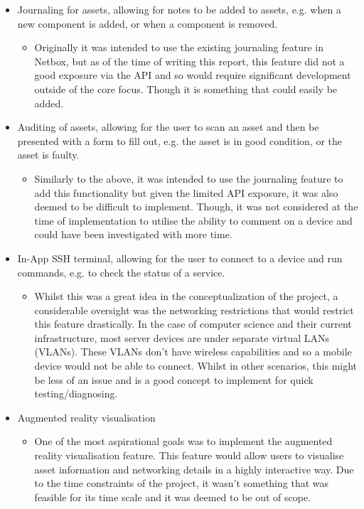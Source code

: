 \documentclass [11pt,a4paper]{article}
\begin{document}
\begin{itemize}[noitemsep,topsep=0pt]
\item Journaling for assets, allowing for notes to be added to assets, e.g. when a new component is added, or when a component is removed.
\begin{itemize}
    \item Originally it was intended to use the existing journaling feature in Netbox, but as of the time of writing this report, this feature did not a good exposure via the API and so would require significant development outside of the core focus. Though it is something that could easily be added.
\end{itemize} 

\item Auditing of assets, allowing for the user to scan an asset and then be presented with a form to fill out, e.g. the asset is in good condition, or the asset is faulty. 
\begin{itemize}
    \item Similarly to the above, it was intended to use the journaling feature to add this functionality but given the limited API exposure, it was also deemed to be difficult to implement. Though, it was not considered at the time of implementation to utilise the ability to comment on a device and could have been investigated with more time. 
\end{itemize} 

\item In-App SSH terminal, allowing for the user to connect to a device and run commands, e.g. to check the status of a service. 
\begin{itemize}
    \item Whilst this was a great idea in the conceptualization of the project, a considerable oversight was the networking restrictions that would restrict this feature drastically. In the case of computer science and their current infrastructure, most server devices are under separate virtual LANs (VLANs). These VLANs don't have wireless capabilities and so a mobile device would not be able to connect. Whilst in other scenarios, this might be less of an issue and is a good concept to implement for quick testing/diagnosing. 
\end{itemize} 

\item Augmented reality visualisation
\begin{itemize}
    \item One of the most aspirational goals was to implement the augmented reality visualisation feature. This feature would allow users to visualise asset information and networking details in a highly interactive way. Due to the time constraints of the project, it wasn't something that was feasible for its time scale and it was deemed to be out of scope. 
\end{itemize}
\end{itemize}
    
\end{document}
